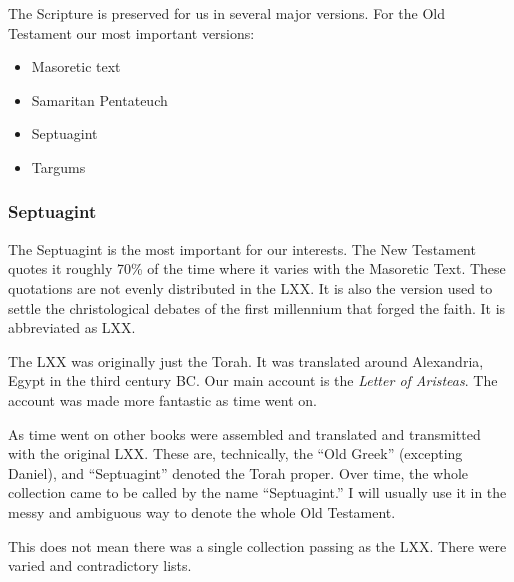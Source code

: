\documentclass{beamer}
\begin{document}
\begin{frame}
  The Scripture is preserved for us in several major versions.
  For the Old Testament our most important versions:\pause
  \begin{itemize}
	\item Masoretic text\pause
	\item Samaritan Pentateuch\pause
	\item Septuagint\pause
	\item Targums
  \end{itemize}
\end{frame}

\subsubsection{Septuagint}

\begin{frame}
  The Septuagint is the most important for our interests.
  The New Testament quotes it roughly 70\% of the time where it varies with the Masoretic Text.
  These quotations are not evenly distributed in the LXX.
  It is also the version used to settle the christological debates of the first millennium that forged the faith.
  It is abbreviated as LXX.
\end{frame}

\begin{frame}
  The LXX was originally just the Torah.
  It was translated around Alexandria, Egypt in the third century BC.
  Our main account is the \emph{Letter of Aristeas}.
  The account was made more fantastic as time went on.
\end{frame}

\begin{frame}
  As time went on other books were assembled and translated and transmitted with the original LXX.
  These are, technically, the ``Old Greek'' (excepting Daniel), and ``Septuagint'' denoted the Torah proper.
  Over time, the whole collection came to be called by the name ``Septuagint.''
  I will usually use it in the messy and ambiguous way to denote the whole Old Testament.
\end{frame}

\begin{frame}
  This does not mean there was a single collection passing as the LXX.
  There were varied and contradictory lists.
\end{frame}
\end{document}
